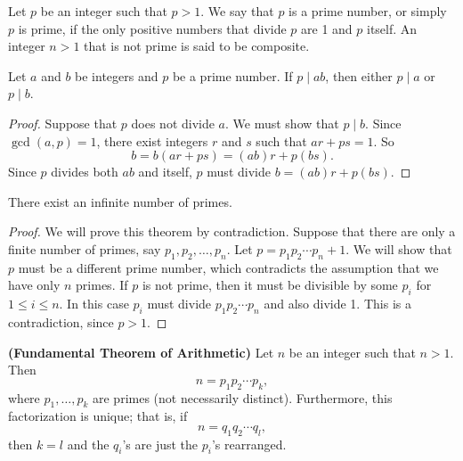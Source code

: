 Let $p$ be an integer such that $p > 1$.  We say that $p$ is a {\bfi prime number}, or simply $p$ is {\bfi prime}, if the only positive numbers that divide $p$ are 1 and $p$ itself.  An integer $n > 1$ that is not prime is said to be {\bfi composite}.  

\begin{lemma}[Euclid]\label{integers_theorem_6}
Let $a$ and $b$ be integers and $p$ be a prime number.  If $p \mid ab$, then either $p \mid a$ or $p \mid b$. 
\end{lemma}

\begin{proof}
Suppose that $p$ does not divide $a$.  We must show that $p \mid b$. Since $\gcd( a, p ) = 1$, there exist integers $r$ and $s$ such that $ar + ps = 1$.  So 
$$
b = b(ar + ps) = (ab)r + p(bs).
$$
Since $p$ divides both $ab$ and itself, $p$ must divide $b = (ab)r + p(bs)$. 
\end{proof}

\begin{theorem}[Euclid]\label{integers_theorem_7}
There exist an infinite number of primes.
\end{theorem}

\begin{proof}
We will prove this theorem by contradiction.  Suppose that there are only a finite number of primes, say $p_1, p_2, \ldots, p_n$.  Let $p = p_1  p_2  \cdots  p_n + 1$.  We will show that $p$ must be a different prime number, which contradicts the assumption that we have only $n$ primes.  If $p$ is not prime, then it must be divisible by some $p_i$ for $1 \leq i \leq n$. In this  case $p_i$ must divide $p_1 p_2 \cdots p_n$ and also divide 1.  This is a contradiction, since $p > 1$. 
\end{proof}

\begin{theorem} {\bf (Fundamental Theorem of Arithmetic)} \label{integers_theorem_8}
Let $n$ be an integer such that $n > 1$.  Then
$$
n = p_1 p_2 \cdots p_k,
$$
where $p_1, \ldots, p_k$ are  primes (not necessarily distinct).  Furthermore, this factorization is unique; that is, if 
$$
n = q_1 q_2 \cdots q_l,
$$
then $k = l$ and the $q_i$'s are just the $p_i$'s rearranged.
\end{theorem}

